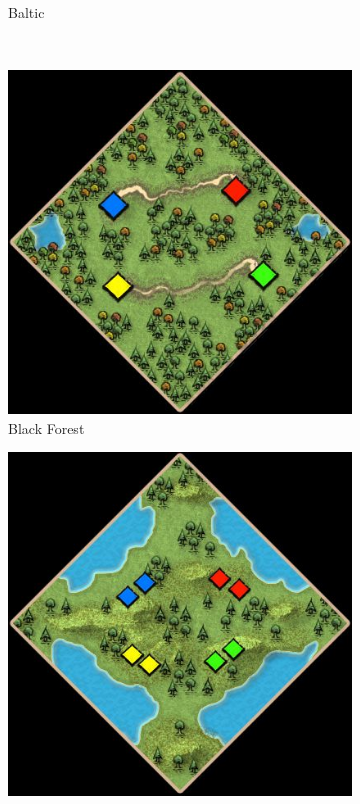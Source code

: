 \begin{figure}
\begin{subfigure}{0.22\textwidth}
        \caption{Baltic}
    \end{subfigure}\\%
    \begin{subfigure}{0.22\textwidth}
        \centering
        \includegraphics[width=1.0\textwidth]{src/images/maps/rm-black-forest}
        \caption{Black Forest}
    \end{subfigure}\quad%
    \begin{subfigure}{0.22\textwidth}
        \centering
        \includegraphics[width=1.0\textwidth]{src/images/maps/rm-budapest}

\end{subfigure}
\end{figure}

